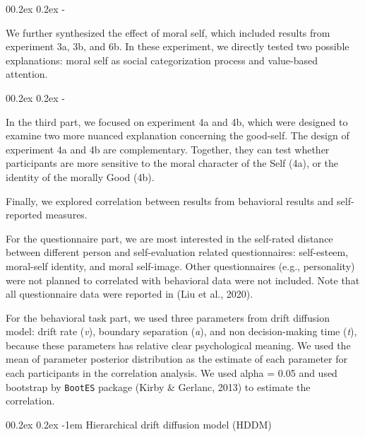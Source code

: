 \documentclass[
  english,
  man]{apa6}
\makeatletter
\let\oldparagraph\paragraph
\renewcommand{\paragraph}[1]{\oldparagraph{#1}\mbox{}}
\let\oldsubparagraph\subparagraph
\renewcommand{\subparagraph}[1]{\oldsubparagraph{#1}\mbox{}}
\renewcommand{\paragraph}{\@startsection{paragraph}{4}{\parindent}%
  {0\baselineskip \@plus 0.2ex \@minus 0.2ex}%
  {-1em}%
  {\normalfont\normalsize\bfseries\itshape\typesectitle}}
\renewcommand{\subparagraph}[1]{\@startsection{subparagraph}{5}{1em}%
  {0\baselineskip \@plus 0.2ex \@minus 0.2ex}%
  {-\z@\relax}%
  {\normalfont\normalsize\itshape\hspace{\parindent}{#1}\textit{\addperi}}{\relax}}
\makeatother
\begin{document}
\hypertarget{effect-of-moral-self}{%
\subparagraph{Effect of moral self}\label{effect-of-moral-self}}

We further synthesized the effect of moral self, which included results from experiment 3a, 3b, and 6b. In these experiment, we directly tested two possible explanations: moral self as social categorization process and value-based attention.

\hypertarget{implicit-interaction-between-valence-and-self-relevance}{%
\subparagraph{Implicit interaction between valence and self-relevance}\label{implicit-interaction-between-valence-and-self-relevance}}

In the third part, we focused on experiment 4a and 4b, which were designed to examine two more nuanced explanation concerning the good-self. The design of experiment 4a and 4b are complementary. Together, they can test whether participants are more sensitive to the moral character of the Self (4a), or the identity of the morally Good (4b).

Finally, we explored correlation between results from behavioral results and self-reported measures.

For the questionnaire part, we are most interested in the self-rated distance between different person and self-evaluation related questionnaires: self-esteem, moral-self identity, and moral self-image. Other questionnaires (e.g., personality) were not planned to correlated with behavioral data were not included. Note that all questionnaire data were reported in (Liu et al., 2020).

For the behavioral task part, we used three parameters from drift diffusion model: drift rate (\emph{v}), boundary separation (\emph{a}), and non decision-making time (\emph{t}), because these parameters has relative clear psychological meaning. We used the mean of parameter posterior distribution as the estimate of each parameter for each participants in the correlation analysis. We used alpha = 0.05 and used bootstrap by \texttt{BootES} package (Kirby \& Gerlanc, 2013) to estimate the correlation.

\hypertarget{hierarchical-drift-diffusion-model-hddm}{%
\paragraph{Hierarchical drift diffusion model (HDDM)}\label{hierarchical-drift-diffusion-model-hddm}}
\end{document}
